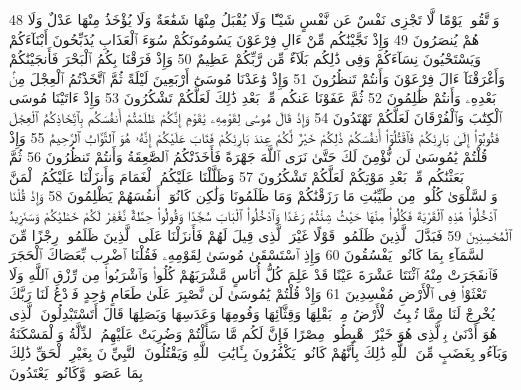 {\tiny\colorbox{cl_aya}{48}} وَٱتَّقُوا۟ يَوْمًا لَّا تَجْزِى نَفْسٌ عَن نَّفْسٍ شَيْـًٔا وَلَا يُقْبَلُ مِنْهَا شَفَٰعَةٌ وَلَا يُؤْخَذُ مِنْهَا عَدْلٌ وَلَا هُمْ يُنصَرُونَ
{\tiny\colorbox{cl_aya}{49}} وَإِذْ نَجَّيْنَٰكُم مِّنْ ءَالِ فِرْعَوْنَ يَسُومُونَكُمْ سُوٓءَ ٱلْعَذَابِ يُذَبِّحُونَ أَبْنَآءَكُمْ وَيَسْتَحْيُونَ نِسَآءَكُمْ وَفِى ذَٰلِكُم بَلَآءٌ مِّن رَّبِّكُمْ عَظِيمٌ
{\tiny\colorbox{cl_aya}{50}} وَإِذْ فَرَقْنَا بِكُمُ ٱلْبَحْرَ فَأَنجَيْنَٰكُمْ وَأَغْرَقْنَآ ءَالَ فِرْعَوْنَ وَأَنتُمْ تَنظُرُونَ
{\tiny\colorbox{cl_aya}{51}} وَإِذْ وَٰعَدْنَا مُوسَىٰٓ أَرْبَعِينَ لَيْلَةً ثُمَّ ٱتَّخَذْتُمُ ٱلْعِجْلَ مِنۢ بَعْدِهِۦ وَأَنتُمْ ظَٰلِمُونَ
{\tiny\colorbox{cl_aya}{52}} ثُمَّ عَفَوْنَا عَنكُم مِّنۢ بَعْدِ ذَٰلِكَ لَعَلَّكُمْ تَشْكُرُونَ
{\tiny\colorbox{cl_aya}{53}} وَإِذْ ءَاتَيْنَا مُوسَى ٱلْكِتَٰبَ وَٱلْفُرْقَانَ لَعَلَّكُمْ تَهْتَدُونَ
{\tiny\colorbox{cl_aya}{54}} وَإِذْ قَالَ مُوسَىٰ لِقَوْمِهِۦ يَٰقَوْمِ إِنَّكُمْ ظَلَمْتُمْ أَنفُسَكُم بِٱتِّخَاذِكُمُ ٱلْعِجْلَ فَتُوبُوٓا۟ إِلَىٰ بَارِئِكُمْ فَٱقْتُلُوٓا۟ أَنفُسَكُمْ ذَٰلِكُمْ خَيْرٌ لَّكُمْ عِندَ بَارِئِكُمْ فَتَابَ عَلَيْكُمْ إِنَّهُۥ هُوَ ٱلتَّوَّابُ ٱلرَّحِيمُ
{\tiny\colorbox{cl_aya}{55}} وَإِذْ قُلْتُمْ يَٰمُوسَىٰ لَن نُّؤْمِنَ لَكَ حَتَّىٰ نَرَى ٱللَّهَ جَهْرَةً فَأَخَذَتْكُمُ ٱلصَّٰعِقَةُ وَأَنتُمْ تَنظُرُونَ
{\tiny\colorbox{cl_aya}{56}} ثُمَّ بَعَثْنَٰكُم مِّنۢ بَعْدِ مَوْتِكُمْ لَعَلَّكُمْ تَشْكُرُونَ
{\tiny\colorbox{cl_aya}{57}} وَظَلَّلْنَا عَلَيْكُمُ ٱلْغَمَامَ وَأَنزَلْنَا عَلَيْكُمُ ٱلْمَنَّ وَٱلسَّلْوَىٰ كُلُوا۟ مِن طَيِّبَٰتِ مَا رَزَقْنَٰكُمْ وَمَا ظَلَمُونَا وَلَٰكِن كَانُوٓا۟ أَنفُسَهُمْ يَظْلِمُونَ
{\tiny\colorbox{cl_aya}{58}} وَإِذْ قُلْنَا ٱدْخُلُوا۟ هَٰذِهِ ٱلْقَرْيَةَ فَكُلُوا۟ مِنْهَا حَيْثُ شِئْتُمْ رَغَدًا وَٱدْخُلُوا۟ ٱلْبَابَ سُجَّدًا وَقُولُوا۟ حِطَّةٌ نَّغْفِرْ لَكُمْ خَطَٰيَٰكُمْ وَسَنَزِيدُ ٱلْمُحْسِنِينَ
{\tiny\colorbox{cl_aya}{59}} فَبَدَّلَ ٱلَّذِينَ ظَلَمُوا۟ قَوْلًا غَيْرَ ٱلَّذِى قِيلَ لَهُمْ فَأَنزَلْنَا عَلَى ٱلَّذِينَ ظَلَمُوا۟ رِجْزًا مِّنَ ٱلسَّمَآءِ بِمَا كَانُوا۟ يَفْسُقُونَ
{\tiny\colorbox{cl_aya}{60}} وَإِذِ ٱسْتَسْقَىٰ مُوسَىٰ لِقَوْمِهِۦ فَقُلْنَا ٱضْرِب بِّعَصَاكَ ٱلْحَجَرَ فَٱنفَجَرَتْ مِنْهُ ٱثْنَتَا عَشْرَةَ عَيْنًا قَدْ عَلِمَ كُلُّ أُنَاسٍ مَّشْرَبَهُمْ كُلُوا۟ وَٱشْرَبُوا۟ مِن رِّزْقِ ٱللَّهِ وَلَا تَعْثَوْا۟ فِى ٱلْأَرْضِ مُفْسِدِينَ
{\tiny\colorbox{cl_aya}{61}} وَإِذْ قُلْتُمْ يَٰمُوسَىٰ لَن نَّصْبِرَ عَلَىٰ طَعَامٍ وَٰحِدٍ فَٱدْعُ لَنَا رَبَّكَ يُخْرِجْ لَنَا مِمَّا تُنۢبِتُ ٱلْأَرْضُ مِنۢ بَقْلِهَا وَقِثَّآئِهَا وَفُومِهَا وَعَدَسِهَا وَبَصَلِهَا قَالَ أَتَسْتَبْدِلُونَ ٱلَّذِى هُوَ أَدْنَىٰ بِٱلَّذِى هُوَ خَيْرٌ ٱهْبِطُوا۟ مِصْرًا فَإِنَّ لَكُم مَّا سَأَلْتُمْ وَضُرِبَتْ عَلَيْهِمُ ٱلذِّلَّةُ وَٱلْمَسْكَنَةُ وَبَآءُو بِغَضَبٍ مِّنَ ٱللَّهِ ذَٰلِكَ بِأَنَّهُمْ كَانُوا۟ يَكْفُرُونَ بِـَٔايَٰتِ ٱللَّهِ وَيَقْتُلُونَ ٱلنَّبِيِّۦنَ بِغَيْرِ ٱلْحَقِّ ذَٰلِكَ بِمَا عَصَوا۟ وَّكَانُوا۟ يَعْتَدُونَ

